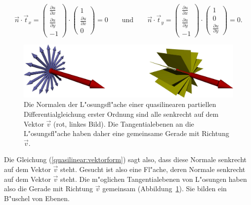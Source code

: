 \[
\vec n\cdot\vec t_x
=
\begin{pmatrix}
\frac{\partial u}{\partial x}\\
\frac{\partial u}{\partial y}\\
-1
\end{pmatrix}
\cdot
\begin{pmatrix}1\\\frac{\partial u}{\partial x}\\0\end{pmatrix}
=0
\qquad
\text{und}
\qquad
\vec n\cdot\vec t_y
=
\begin{pmatrix}
\frac{\partial u}{\partial x}\\
\frac{\partial u}{\partial y}\\
-1
\end{pmatrix}
\cdot
\begin{pmatrix}1\\0\\\frac{\partial u}{\partial y}\end{pmatrix}
=0.
\]
\begin{figure}
\begin{center}
\includegraphics[width=\hsize]{3d/normals.jpg}
\end{center}
\caption{Die Normalen der L"osungsfl"ache einer quasilinearen
partiellen Differentialgleichung erster Ordnung sind alle senkrecht
auf dem Vektor $\vec v$ (rot, linkes Bild). Die Tangentialebenen an
die L"osungsfl"ache haben daher eine gemeinsame Gerade mit Richtung $\vec v$.
\label{geometrie:normals}}
\end{figure}%
Die Gleichung (\ref{quasilinear:vektorform}) sagt also,
dass diese Normale senkrecht auf dem Vektor $\vec v$ steht.
Gesucht ist also eine Fl"ache, deren Normale senkrecht auf dem
Vektor $\vec v$ steht. Die m"oglichen Tangentialebenen von L"osungen
haben also die Gerade mit Richtung $\vec v$ gemeinsam
(Abbildung~\ref{geometrie:normals}).
Sie bilden ein B"uschel von Ebenen.

